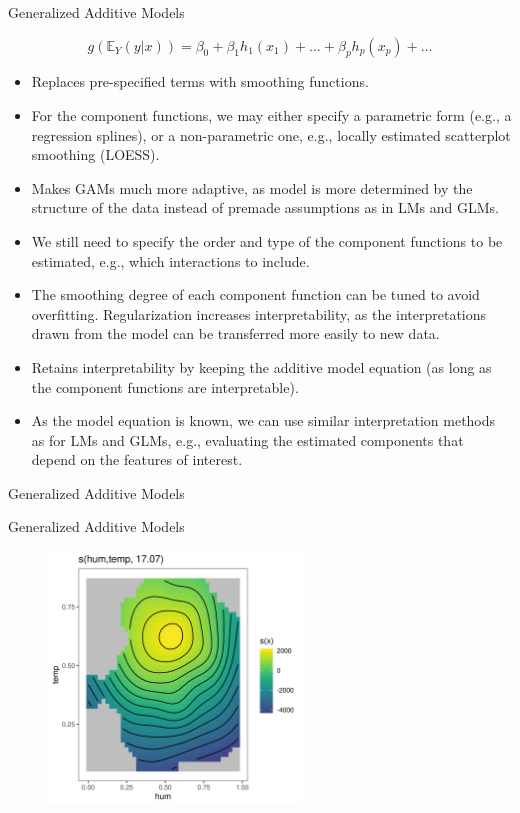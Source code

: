 \documentclass[11pt,compress,t,notes=noshow, xcolor=table]{beamer}
\begin{document}
\begin{vbframe}{Generalized Additive Models}

$$
g\left(\mathbb{E}_Y(y \vert x)\right) = \beta_0 + \beta_1 h_1(x_1) + \dots + \beta_p h_p(x_p) + \dots
$$
\begin{itemize}
\setlength\itemsep{2em}
\item Replaces pre-specified terms with smoothing functions.
\item For the component functions, we may either specify a parametric form (e.g., a regression splines), or a non-parametric one, e.g., locally estimated scatterplot smoothing (LOESS).
\item Makes GAMs much more adaptive, as model is more determined by the structure of the data instead of premade assumptions as in LMs and GLMs.
\item We still need to specify the order and type of the component functions to be estimated, e.g., which interactions to include.
\item The smoothing degree of each component function can be tuned to avoid overfitting. Regularization increases interpretability, as the interpretations drawn from the model can be transferred more easily to new data.
\item Retains interpretability by keeping the additive model equation (as long as the component functions are interpretable). 
\item
As the model equation is known, we can use similar interpretation methods as for LMs and GLMs, e.g., evaluating the estimated components that depend on the features of interest.
\end{itemize}
\end{vbframe}


\begin{vbframe}{Generalized Additive Models}
\tiny

\end{vbframe}


\begin{vbframe}{Generalized Additive Models}
\begin{figure}
  \includegraphics[width = 0.6\textwidth]{figure/gam_effect_plot.png}
\end{figure}
\end{vbframe}
\end{document}
